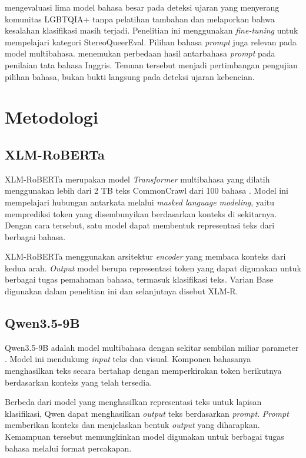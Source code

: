 \documentclass[11pt]{article}
\begin{document}
\citet{nguyen-etal-2025-leveraging} mengevaluasi lima model bahasa besar pada deteksi ujaran yang menyerang komunitas LGBTQIA+ tanpa pelatihan tambahan dan melaporkan bahwa kesalahan klasifikasi masih terjadi. Penelitian ini menggunakan \textit{fine-tuning} untuk mempelajari kategori StereoQueerEval. Pilihan bahasa \textit{prompt} juga relevan pada model multibahasa. \citet{behzad-etal-2024-ask} menemukan perbedaan hasil antarbahasa \textit{prompt} pada penilaian tata bahasa Inggris. Temuan tersebut menjadi pertimbangan pengujian pilihan bahasa, bukan bukti langsung pada deteksi ujaran kebencian.

\section{Metodologi}
\subsection{XLM-RoBERTa}
XLM-RoBERTa merupakan model \textit{Transformer} multibahasa yang dilatih menggunakan lebih dari 2 TB teks CommonCrawl dari 100 bahasa \citep{conneau-etal-2020-unsupervised}. Model ini mempelajari hubungan antarkata melalui \textit{masked language modeling}, yaitu memprediksi token yang disembunyikan berdasarkan konteks di sekitarnya. Dengan cara tersebut, satu model dapat membentuk representasi teks dari berbagai bahasa.

XLM-RoBERTa menggunakan arsitektur \textit{encoder} yang membaca konteks dari kedua arah. \textit{Output} model berupa representasi token yang dapat digunakan untuk berbagai tugas pemahaman bahasa, termasuk klasifikasi teks. Varian Base digunakan dalam penelitian ini dan selanjutnya disebut XLM-R.

\subsection{Qwen3.5-9B}
Qwen3.5-9B adalah model multibahasa dengan sekitar sembilan miliar parameter \citep{qwen-team-2026-qwen35}. Model ini mendukung \textit{input} teks dan visual. Komponen bahasanya menghasilkan teks secara bertahap dengan memperkirakan token berikutnya berdasarkan konteks yang telah tersedia.

Berbeda dari model yang menghasilkan representasi teks untuk lapisan klasifikasi, Qwen dapat menghasilkan \textit{output} teks berdasarkan \textit{prompt}. \textit{Prompt} memberikan konteks dan menjelaskan bentuk \textit{output} yang diharapkan. Kemampuan tersebut memungkinkan model digunakan untuk berbagai tugas bahasa melalui format percakapan.
\end{document}
